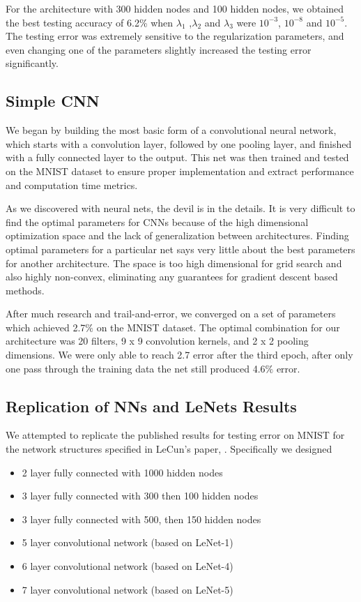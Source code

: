 \documentclass[12pt, twocolumn]{article}
\begin{document}
For the architecture with 300 hidden nodes and 100 hidden nodes, we obtained the best testing accuracy of 6.2\% when $\lambda_1$ ,$\lambda_2$ and $\lambda_3$ were $10^{-3}$, $10^{-8}$ and $10^{-5}$. The testing error was extremely sensitive to  the regularization parameters, and even changing one of the parameters slightly increased the testing error significantly. 

\subsection{Simple CNN}
We began by building the most basic form of a convolutional neural network, which starts with a convolution layer, followed by one pooling layer, and finished with a fully connected layer to the output. This net was then trained and tested on the MNIST dataset to ensure proper implementation and extract performance and computation time metrics. 

As we discovered with neural nets, the devil is in the details. It is very difficult to find the optimal parameters for CNNs because of the high dimensional optimization space and the lack of generalization between architectures. Finding optimal parameters for a particular net says very little about the best parameters for another architecture. The space is too high dimensional for grid search and also highly non-convex, eliminating any guarantees for gradient descent based methods. 

After much research and trail-and-error, we converged on a set of parameters which achieved 2.7$\%$ on the MNIST dataset. The optimal combination for our architecture was 20 filters, 9 x 9 convolution kernels, and 2 x 2 pooling dimensions. We were only able to reach 2.7 error after the third epoch, after only one pass through the training data the net still produced 4.6$\%$ error. 

\subsection{Replication of NNs and LeNets Results}

We attempted to replicate the published results for testing error on MNIST for the network structures specified in LeCun's paper, \cite{LeCun1998}. Specifically we designed

\begin{itemize}
\item{2 layer fully connected with 1000 hidden nodes}
\item{3 layer fully connected with 300 then 100 hidden nodes}
\item{3 layer fully connected with 500, then 150 hidden nodes}
\item{5 layer convolutional network (based on LeNet-1)}
\item{6 layer convolutional network (based on LeNet-4)}
\item{7 layer convolutional network (based on LeNet-5)}
\end{itemize}
\end{document}
